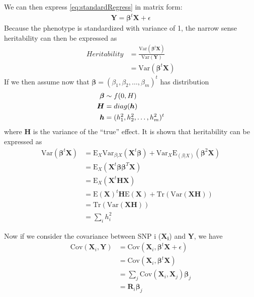 			We can then express \cref{eq:standardRegress} in matrix form:
			\begin{align}
				\boldsymbol{Y}=\boldsymbol{\beta}^t\boldsymbol{X}+\epsilon
				\label{eq:matrixRegress}
			\end{align}
			Because the phenotype is standardized with variance of 1, the narrow sense heritability can then be expressed as
			\begin{align}
				Heritability& = \frac{\mathrm{Var}(\boldsymbol{\beta}^t\boldsymbol{X})}{\mathrm{Var}(\boldsymbol{Y})} \nonumber\\
				&=\mathrm{Var}(\boldsymbol{\beta}^t\boldsymbol{X})
			\end{align}
			If we then assume now that $\boldsymbol{\beta} = (\beta_1, \beta_2,\dots,\beta_m)^t$ has distribution
			\begin{align*}
				\boldsymbol{\beta}&\sim f(0,\boldmath{H})\\
				\boldsymbol{H}&=diag(\boldsymbol{h})\\
				\boldsymbol{h}&=(h_1^2,h_2^2,\dots,h_m^2)^t
			\end{align*}
			where $\boldsymbol{H}$ is the variance of the ``true'' effect. 
			It is shown that heritability can be expressed as %
			\begin{align}
			\mathrm{Var}(\boldsymbol{\beta}^t\boldsymbol{X}) &= \mathrm{E}_X\mathrm{Var}_{\beta|X}(\boldsymbol{X}^t\boldsymbol{\beta})+\mathrm{Var}_X\mathrm{E}_{(\beta|X)}(\boldsymbol{\beta}^2\boldsymbol{X}) \nonumber\\
			&=\mathrm{E}_X(\boldsymbol{X}^t\boldsymbol{\beta\beta}^T\boldsymbol{X}) \nonumber\\ 
			&= \mathrm{E}_X(\boldsymbol{X}^t\boldsymbol{HX}) \nonumber\\
			&= \mathrm{E}(\boldsymbol{X})^t\boldsymbol{H}\mathrm{E}(\boldsymbol{X})+\mathrm{Tr}(\mathrm{Var}(\boldsymbol{X}\boldsymbol{H})) \nonumber\\
			&=\mathrm{Tr}(\mathrm{Var}(\boldsymbol{X}\boldsymbol{H})) \nonumber\\
			&=\sum_ih_i^2
			\label{eq:proveHerit}
			\end{align}
			
			Now if we consider the covariance between \gls{SNP} i ($\boldsymbol{X_i}$) and $\boldsymbol{Y}$, we have
			\begin{align}
			 \mathrm{Cov}(\boldsymbol{X}_i,\boldsymbol{Y}) &= \mathrm{Cov}(\boldsymbol{X}_i,\boldsymbol{\beta}^t\boldsymbol{X}+\epsilon) \nonumber\\
			 &=\mathrm{Cov}(\boldsymbol{X}_i,\boldsymbol{\beta}^t\boldsymbol{X}) \nonumber\\
			 &=\sum_j{\mathrm{Cov}(\boldsymbol{X}_i,\boldsymbol{X}_j)\boldsymbol{\beta}_j} \nonumber\\
			 &=\boldsymbol{R}_i\boldsymbol{\beta}_j
			 \label{eq:covPhenoTrue}
			\end{align}
			
